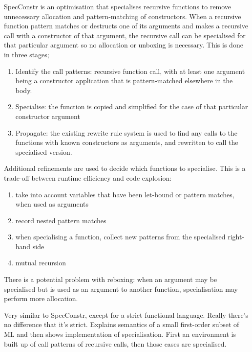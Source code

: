 SpecConstr is an optimisation that specialises recursive functions to remove unnecessary allocation and pattern-matching of constructors.
When a recursive function pattern matches or destructs one of its arguments and makes a recursive call with a constructor of that argument,
the recursive call can be specialised for that particular argument so no allocation or unboxing is necessary.
This is done in three stages;
\begin{enumerate}
\item
Identify the call patterns: recursive function call, with at least one argument being a constructor application that is pattern-matched elsewhere in the body.
\item
Specialise: the function is copied and simplified for the case of that particular constructor argument
\item
Propagate: the existing rewrite rule system is used to find any calls to the functions with known constructors as arguments, and rewritten to call the specialised version.
\end{enumerate}
Additional refinements are used to decide which functions to specialise. This is a trade-off between runtime efficiency and code explosion:
\begin{enumerate}
\item
 take into account variables that have been let-bound or pattern matches, when used as arguments
\item
 record nested pattern matches
\item
 when specialising a function, collect new patterns from the specialised right-hand side
\item
 mutual recursion
\end{enumerate}
There is a potential problem with reboxing: when an argument may be specialised but is used as an argument to another function, specialisation may perform more allocation.




Very similar to SpecConstr, except for a strict functional language.
Really there's no difference that it's strict.
Explains semantics of a small first-order subset of ML and then shows implementation of specialisation.
First an environment is built up of call patterns of recursive calls, then those cases are specialised.


